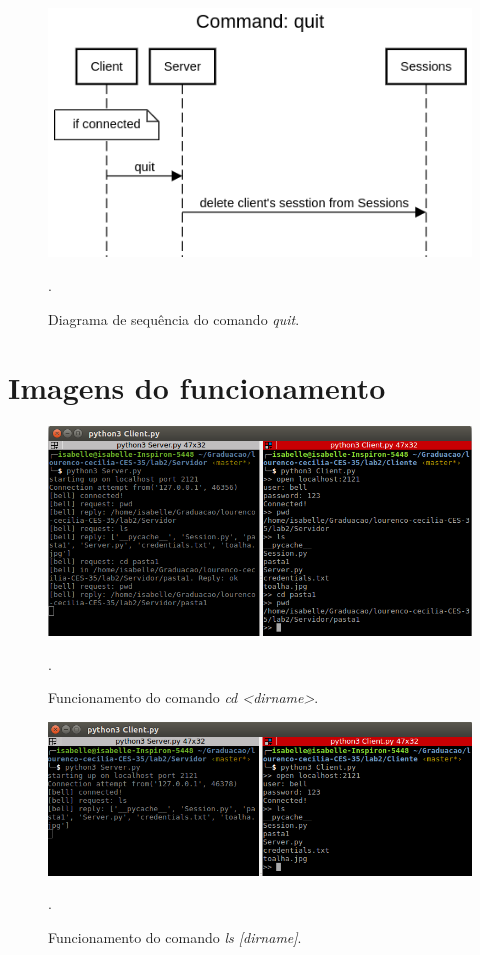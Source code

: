 \documentclass[conference]{IEEEtran}
\begin{document}
\begin{figure}[H]
\centering
\centerline{\includegraphics[scale=0.4]{diagrams/Command_quit.png}}
\caption{Diagrama de sequência do comando \textit{quit}.}.
\label{quit}
\end{figure}

\section*{Imagens do funcionamento}

\begin{figure}[H]
\centering
\centerline{\includegraphics[scale=0.3]{prints/cd1.png}}
\caption{Funcionamento do comando \textit{cd <dirname>}.}.
\label{cd1}
\end{figure}

\begin{figure}[H]
\centering
\centerline{\includegraphics[scale=0.3]{prints/ls1.png}}
\caption{Funcionamento do comando \textit{ls [dirname]}.}.
\label{ls1}
\end{figure}
\end{document}
